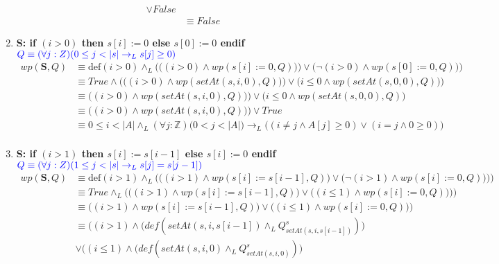 \documentclass{article}
\begin{document}
\begin{enumerate}[label=\alph*)]
\begin{align*}
   								\vee False\\
   							&\equiv False
   		\end{align*}
	\item
		\textbf{S: if $(i>0)$ then $s[i] := 0$ else $s[0] := 0$ endif}\\
   		\hspace*{24mm}$\color{blue}Q \equiv (\forall j :Z)(0 \leq j < |s| 
   			\rightarrow_L s[j] \geq 0)$\\
   		\begin{align*}
   			wp(\textbf{S},Q)&\equiv \textrm{def}(i>0)\wedge_L 
   				\Bigg(\Big((i>0)\wedge wp(s[i] := 0,Q))\Big) \vee\Big(\neg (i>0)\wedge wp(s[0] := 0,Q)\Big)\Bigg)\\
   					&\equiv True \wedge \Bigg(\Big((i>0)\wedge wp(setAt(s,i,0),Q))\Big) 
   						\vee\Big(i\leq0\wedge wp(setAt(s,0,0),Q)\Big)\Bigg)\\ 
   				&\equiv \Big((i>0)\wedge wp(setAt(s,i,0),Q))\Big) 
   						\vee\Big(i\leq0\wedge wp(setAt(s,0,0),Q)\Big)\\ 
   				&\equiv \Big((i>0)\wedge wp(setAt(s,i,0),Q))\Big) 
   						\vee True\\ 
   				&\equiv 0\leq i<|A| \wedge_L (\forall j :\mathbb{Z})
				\Big(0 < j < |A|\Big) \rightarrow_L  
				\Big((i\neq j \wedge A[j] \geq 0)\vee(i=j\wedge 0\geq 0)\Big)\\			   				  				
   		\end{align*}
	\item
		\textbf{S: if $(i>1)$ then $s[i] := s[i-1]$ else $s[i] := 0$ endif}\\
   		\hspace*{24mm}$\color{blue}Q \equiv (\forall j :Z)(1 \leq j < |s| 
   			\rightarrow_L s[j] = s[j - 1])$\\
   		\begin{align*}
   			wp(\textbf{S},Q)&\equiv \textrm{def}(i>1)\wedge_L 
   				\Bigg(\Big((i>1)\wedge wp(s[i] := s[i-1],Q)\Big) \vee\Big(\neg (i>1)\wedge wp(s[i] := 0,Q))\Big)\Bigg)\\
   							&\equiv True \wedge_L\Bigg(\Big((i>1)\wedge wp(s[i] := s[i-1],Q)\Big) \vee\Big( (i\leq1)\wedge wp(s[i] := 0,Q))\Big)\Bigg)\\
   							&\equiv \Big((i>1)\wedge wp(s[i] := s[i-1],Q)\Big) \vee\Big( (i\leq1)\wedge wp(s[i] := 0,Q))\Big)\\
   							&\equiv \Big((i>1)\wedge (def(setAt(s,i,s[i-1])\wedge_L Q_{setAt(s,i,s[i-1])}^{s})\Big)\\
   							 &\vee\Big( (i\leq1)\wedge (def(setAt(s,i,0)\wedge_L Q_{setAt(s,i,0)}^{s})\Big)\\

\end{align*}
\end{enumerate}
\end{document}
